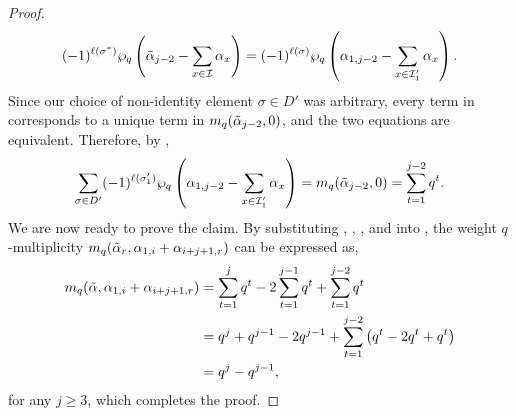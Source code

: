 \documentclass[10pt]{article}
\newcommand{\hr}[0]{\Tilde{\alpha}}
\newcommand{\qpartition}[1]{\wp_q\left(#1\right)}
\begin{document}
\begin{proof}
\begin{equation*}
        (-1)^{\ell(\sigma^*)}\qpartition{\hr_{j-2}-\sum_{x\in\mathcal{I}}\alpha_x}=(-1)^{\ell(\sigma)}\qpartition{\alpha_{1,j-2}-\sum_{x\in\mathcal{I}_1'}\alpha_x}.
    \end{equation*}
    Since our choice of non-identity element $\sigma\in D'$ was arbitrary, every term in  corresponds to a unique term in $m_q(\hr_{j-2},0)$, and the two equations are equivalent. Therefore, by ,
    \begin{equation}
        \sum_{\sigma\in D'}(-1)^{\ell(\sigma_1')}\qpartition{\alpha_{1,j-2}-\sum_{x\in\mathcal{I}'_1}\alpha_x} = m_q(\hr_{j-2},0) = \sum_{t=1}^{j-2}q^t.\label{DIFF OF EQS SUM 4}
    \end{equation}
    We are now ready to prove the claim. By substituting , , , and  into , the weight $q$-multiplicity $m_q(\hr_r,\alpha_{1,i}+\alpha_{i+j+1,r})$ can be expressed as,
    \begin{align}
         m_q(\hr,\alpha_{1,i}+\alpha_{i+j+1,r}) &= \sum_{t=1}^j q^t -2\sum_{t=1}^{j-1} q^t + \sum_{t=1}^{j-2} q^t\notag \\
         &=q^j+q^{j-1}-2q^{j-1}+\sum_{t=1}^{j-2}\left(q^t-2q^t+q^t\right) \notag\\
         &=q^j-q^{j-1},\notag
    \end{align}
    for any $j\geq 3$, 
    which completes the proof.
\end{proof}
\end{document}
